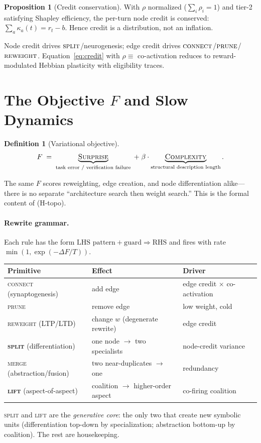 \documentclass[11pt]{article}
\theoremstyle{definition}
\newtheorem{definition}{Definition}
\newtheorem{proposition}{Proposition}
\begin{document}
\begin{proposition}[Credit conservation]
With $\rho$ normalized ($\sum_i\rho_i=1$) and tier-2 satisfying Shapley
efficiency, the per-turn node credit is conserved:
$\sum_a\kappa_a(t)=r_t-b$. Hence credit is a distribution, not an inflation.
\end{proposition}

Node credit drives $\textsc{split}$/neurogenesis; edge credit drives
$\textsc{connect}$/$\textsc{prune}$/$\textsc{reweight}$. Equation~\eqref{eq:credit}
with $\rho\equiv$ co-activation reduces to reward-modulated Hebbian plasticity
with eligibility traces.

\section{The Objective $F$ and Slow Dynamics}
\label{sec:slow}

\begin{definition}[Variational objective]
\[
F \;=\; \underbrace{\textsc{Surprise}}_{\text{task error / verification failure}}
\;+\;\beta\cdot\underbrace{\textsc{Complexity}}_{\text{structural description length}} .
\]
\end{definition}
The same $F$ scores reweighting, edge creation, and node differentiation
alike---there is no separate ``architecture search then weight search.''
This is the formal content of (H-topo).

\paragraph{Rewrite grammar.}
Each rule has the form $\text{LHS pattern}+\text{guard}\Rightarrow\text{RHS}$
and fires with rate $\min(1,\exp(-\Delta F/T))$.
\begin{center}
\begin{tabular}{@{}lll@{}}
\toprule
Primitive & Effect & Driver \\
\midrule
\textsc{connect} (synaptogenesis) & add edge & edge credit $\times$ co-activation \\
\textsc{prune} & remove edge & low weight, cold \\
\textsc{reweight} (LTP/LTD) & change $w$ (degenerate rewrite) & edge credit \\
\textbf{\textsc{split}} (differentiation) & one node $\to$ two specialists & node-credit variance \\
\textsc{merge} (abstraction/fusion) & two near-duplicates $\to$ one & redundancy \\
\textbf{\textsc{lift}} (aspect-of-aspect) & coalition $\to$ higher-order aspect & co-firing coalition \\
\bottomrule
\end{tabular}
\end{center}
\textsc{split} and \textsc{lift} are the \emph{generative core}: the only two
that create new symbolic units (differentiation top-down by specialization;
abstraction bottom-up by coalition). The rest are housekeeping.
\end{document}

